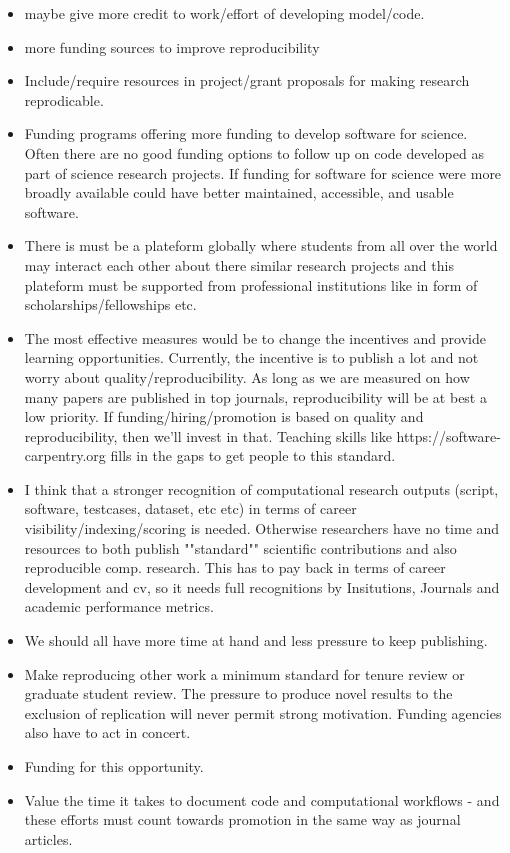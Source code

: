 \documentclass{article}
\begin{document}
\begin{itemize}
	\item maybe give more credit to work/effort of developing model/code.
	\item more funding sources to improve reproducibility
	\item Include/require resources in project/grant proposals for making research reprodicable.
	\item Funding programs offering more funding to develop software for science. Often there are no good funding options to follow up on code developed as part of science research projects. If funding for software for science were more broadly available could have better maintained, accessible, and usable software.
	\item There is must be a plateform globally where students from all over the world may interact each other about there similar research projects and this plateform must be supported from professional institutions like in form of scholarships/fellowships etc.
	\item The most effective measures would be to change the incentives and provide learning opportunities. Currently, the incentive is to publish a lot and not worry about quality/reproducibility. As long as we are measured on how many papers are published in top journals, reproducibility will be at best a low priority. If funding/hiring/promotion is based on quality and reproducibility, then we'll invest in that. Teaching skills like https://software-carpentry.org fills in the gaps to get people to this standard.
	\item I think that a stronger recognition of computational research outputs (script, software, testcases, dataset, etc etc) in terms of career visibility/indexing/scoring is needed. Otherwise researchers have no time and resources to both publish ""standard"" scientific contributions and also reproducible comp. research. This has to pay back in terms of career development and cv, so it needs full recognitions by Insitutions, Journals and academic performance metrics.
	\item We should all have more time at hand and less pressure to keep publishing.
	\item Make reproducing other work a minimum standard for tenure review or graduate student review. The pressure to produce novel results to the exclusion of replication will never permit strong motivation. Funding agencies also have to act in concert.
	\item Funding for this opportunity.
	\item Value the time it takes to document code and computational workflows - and these efforts must count towards promotion in the same way as journal articles. 

\end{itemize}
\end{document}
